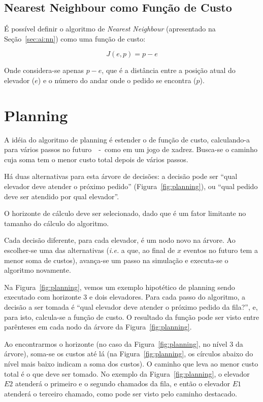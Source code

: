 \subsection{Nearest Neighbour como Função de Custo}

É possível definir o algoritmo de \textit{Nearest Neighbour} (apresentado na
Seção~\ref{sec:ai:nn}) como uma função de
custo:

\[J(e, p) = p - e\]

Onde considera-se apenas $p - e$, que é a distância entre a posição atual do
elevador ($e$) e o número do andar onde o pedido se encontra ($p$).

\section{Planning}


A idéia do algoritmo de planning é estender o de função de custo, calculando-a
para vários passos no futuro~\cite{Koehler00elevatorcontrol}~-~como em um jogo de xadrez. Busca-se o
caminho cuja soma tem o menor custo total depois de vários passos.

Há duas alternativas para esta árvore de decisões: a decisão pode ser ``qual
elevador deve atender o próximo pedido'' (Figura~\ref{fig:planning}),
ou ``qual pedido deve ser atendido por qual elevador''. %

O horizonte de cálculo deve ser selecionado, dado que é um fator limitante no
tamanho do cálculo do algoritmo.

Cada decisão diferente, para cada elevador, é um nodo novo na árvore. Ao
escolher-se uma das alternativas (\textit{i.e.} a que, ao final de $x$ eventos
no futuro tem a menor soma de custos), avança-se um passo na simulação e executa-se o
algoritmo novamente.

Na Figura~\ref{fig:planning}, vemos um exemplo hipotético de planning sendo executado com
horizonte 3 e dois elevadores. Para cada passo do algoritmo, a decisão a ser
tomada é ``qual elevador deve atender o próximo pedido da fila?'', e, para isto,
calcula-se a função de custo. O resultado da função pode ser visto entre
parênteses em cada nodo da árvore da Figura~\ref{fig:planning}.

Ao encontrarmos o horizonte (no caso da Figura~\ref{fig:planning}, no nível 3 da
árvore), soma-se os custos até lá (na Figura~\ref{fig:planning}, os círculos
abaixo do nível mais baixo indicam a soma dos custos). O caminho que leva ao
menor custo total é o que deve ser tomado. No exemplo da Figura~\ref{fig:planning}, o
elevador $E2$ atenderá o primeiro e o segundo chamados da fila, e então o
elevador $E1$ atenderá o terceiro chamado, como pode ser visto pelo caminho destacado.

